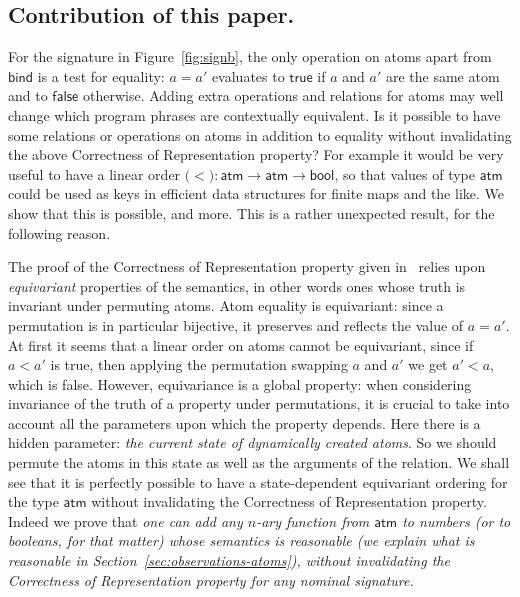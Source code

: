\documentclass{LMCS}
\theoremstyle{plain}
\theoremstyle{definition}
\newcommand{\atm}[1][a]{#1}
\newcommand{\ATM}{\kw{atm}}
\newcommand{\BIND}{\kw{bind}}
\newcommand{\BOOL}{\kw{bool}}
\newcommand{\EQ}{\mathbin{\kw{=}}}
\newcommand{\FALSE}{\kw{false}}
\newcommand{\FUNTY}{\mathbin{\rightarrow}}
\newcommand{\LP}{\mathopen{\kw{(}}}
\newcommand{\kw}[1]{\mathsf{#1}}
\newcommand{\OFTY}{\mathrel{\kw{:}}}
\newcommand{\RP}{\mathclose{\kw{)}}}
\newcommand{\TRUE}{\kw{true}}
\begin{document}
\subsection*{Contribution of this paper.}

For the signature in Figure~\ref{fig:signb}, the only operation on
atoms apart from $\BIND$ is a test for equality: $\atm\EQ \atm'$
evaluates to $\TRUE$ if $\atm$ and $\atm'$ are the same atom and to
$\FALSE$ otherwise. Adding extra operations and relations for atoms
may well change which program phrases are contextually equivalent.  Is
it possible to have some relations or operations on atoms in addition
to equality without invalidating the above Correctness of
Representation property? For example it would be very useful to have a
linear order $\LP\kw{<}\RP\OFTY\ATM\FUNTY\ATM\FUNTY\BOOL$, so that
values of type $\ATM$ could be used as keys in efficient data
structures for finite maps and the like. We show that this  is
possible, and more.  This is a rather unexpected result, for the
following reason.

The proof of the Correctness of Representation property given
in~\cite{ShinwellMR:freafp,PittsAM:monsf} relies upon
\emph{equivariant} properties of the semantics, in other words ones
whose truth is invariant under permuting atoms.  Atom equality is
equivariant: since a permutation is in particular bijective, it
preserves and reflects the value of $\atm\EQ \atm'$. At first it seems
that a linear order on atoms cannot be equivariant, since if
$\atm\mathbin{\kw{<}} \atm'$ is true, then applying the permutation
swapping $\atm$ and $\atm'$ we get $\atm'\mathbin{\kw{<}}\atm$, which
is false. However, equivariance is a global property: when considering
invariance of the truth of a property under permutations, it is
crucial to take into account all the parameters upon which the
property depends. Here there is a hidden parameter: \emph{the current
  state of dynamically created atoms}. So we should permute the atoms
in this state as well as the arguments of the relation. We shall see
that it is perfectly possible to have a state-dependent equivariant
ordering for the type $\ATM$ without invalidating the Correctness of
Representation property.  Indeed we prove that \emph{one can add any
  $n$-ary function from $\ATM$ to numbers \emph{(or to booleans, for
    that matter)} whose semantics is reasonable \emph{(we explain what
    is reasonable in Section~\ref{sec:observations-atoms})}, without
  invalidating the Correctness of Representation property for any
  nominal signature.}
\end{document}
